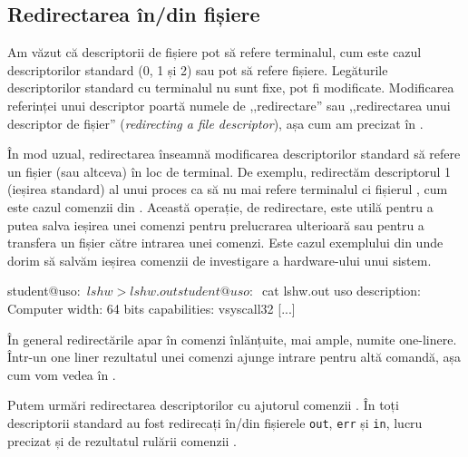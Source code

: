 \subsection{Redirectarea în/din fișiere}
\label{sec:process:redirect}

Am văzut că descriptorii de fișiere pot să refere terminalul, cum este cazul
descriptorilor standard (0, 1 și 2) sau pot să refere fișiere. Legăturile
descriptorilor standard cu terminalul nu sunt fixe, pot fi modificate.
Modificarea referinței unui descriptor poartă numele de ,,redirectare'' sau
,,redirectarea unui descriptor de fișier'' (\textit{redirecting a file
descriptor}), așa cum am precizat în .

În mod uzual, redirectarea înseamnă modificarea descriptorilor standard să
refere un fișier (sau altceva) în loc de terminal. De exemplu, redirectăm
descriptorul 1 (ieșirea standard) al unui proces ca să nu mai refere terminalul ci
fișierul , cum este cazul comenzii din .
Această operație, de redirectare, este utilă pentru a putea salva ieșirea unei
comenzi pentru prelucrarea ulterioară sau pentru a transfera un fișier către
intrarea unei comenzi. Este cazul exemplului din  unde dorim să
salvăm ieșirea comenzii de investigare a hardware-ului unui sistem.

\begin{screen}[caption={Redirectarea ieșirii standard (stdout)},label={lst:process:redirect-stdout}]
student@uso:~$ lshw > lshw.out
student@uso:~$ cat lshw.out
uso
    description: Computer
    width: 64 bits
    capabilities: vsyscall32
[...]
\end{screen}

În general redirectările apar în comenzi înlănțuite, mai ample, numite
one-linere. Într-un one liner rezultatul unei comenzi ajunge intrare pentru
altă comandă, așa cum vom vedea în
.

Putem urmări redirectarea descriptorilor cu ajutorul comenzii . În  toți descriptorii standard au fost redirecați în/din fișierele \texttt{out}, \texttt{err} și \texttt{in}, lucru precizat și de rezultatul rulării comenzii .


